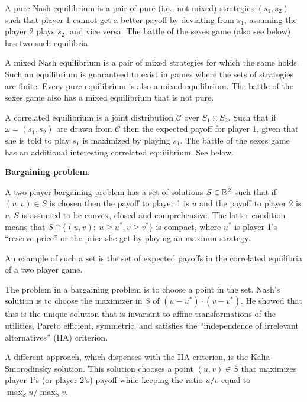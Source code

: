 \documentclass[11pt]{article} \usepackage{amssymb}
\begin{document}
\begin{enumerate}
\begin{enumerate}
      A pure Nash equilibrium is a pair of pure (i.e., not mixed)
      strategies $(s_1,s_2)$ such that player 1 cannot get a better
      payoff by deviating from $s_1$, assuming the player 2 plays
      $s_2$, and vice versa.  The battle of the sexes game (also see
      below) has two such equilibria.

      A mixed Nash equilibrium is a pair of mixed strategies for which
      the same holds. Such an equilibrium is guaranteed to exist in
      games where the sets of strategies are finite. Every pure
      equilibrium is also a mixed equilibrium. The battle of the sexes
      game also has a mixed equilibrium that is not pure.

      A correlated equilibrium is a joint distribution $\mathcal{C}$
      over $S_1 \times S_2$. Such that if $\omega = (s_1,s_2)$ are
      drawn from $\mathcal{C}$ then the expected payoff for player 1,
      given that she is told to play $s_1$ is maximized by playing
      $s_1$. The battle of the sexes game has an additional
      interesting correlated equilibrium. See below.

      \vspace{0.1in}
      {\bf Bargaining problem.}

      A two player bargaining problem has a set of solutions $S \in
      \mathbb R^2$ such that if $(u,v)\in S$ is chosen then the payoff to
      player 1 is $u$ and the payoff to player 2 is $v$. $S$ is
      assumed to be convex, closed and comprehensive. The latter
      condition means that $S \cap \{(u,v):\: u \geq u^*, v \geq
      v^*\}$ is compact, where $u^*$ is player 1's ``reserve price''
      or the price she get by playing an maximin strategy.

      An example of such a set is the set of expected payoffs in the
      correlated equilibria of a two player game.

      The problem in a bargaining problem is to choose a point in the
      set. Nash's solution is to choose the maximizer in $S$ of
      $(u-u^*)\cdot(v-v^*)$. He showed that this is the unique
      solution that is invariant to affine transformations of the
      utilities, Pareto efficient, symmetric, and satisfies the
      ``independence of irrelevant alternatives'' (IIA) criterion.

      A different approach, which dispenses with the IIA criterion, is
      the Kalia-Smorodinsky solution. This solution chooses a point 
      $(u,v) \in S$ that maximizes player 1's (or player 2's) payoff while
      keeping the ratio $u/v$ equal to $\max_S u / \max_S v$. 


\end{enumerate}
\end{enumerate}
\end{document}
